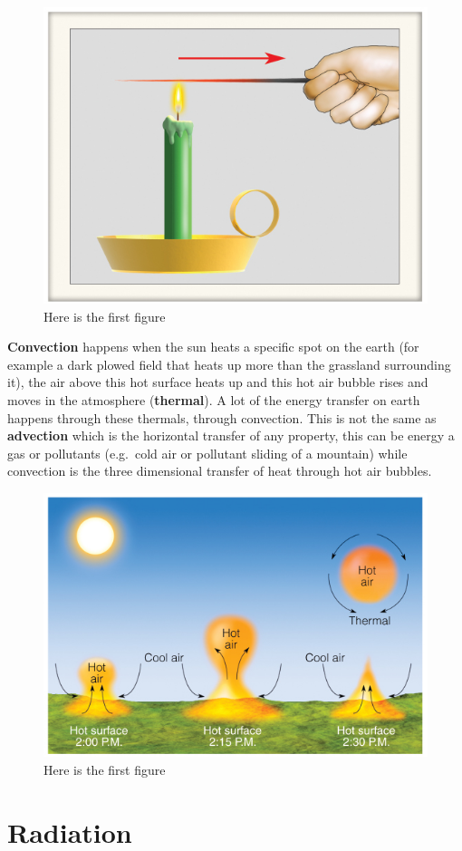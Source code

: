 \documentclass[oneside]{book}
\begin{document}
\begin{figure}

{\centering \includegraphics[width=0.5\linewidth]{figures/Figure118} 

}

\caption{Here is the first figure}\label{fig:Heattransfer2}
\end{figure}

\textbf{Convection} happens when the sun heats a specific spot on the
earth (for example a dark plowed field that heats up more than the
grassland surrounding it), the air above this hot surface heats up and
this hot air bubble rises and moves in the atmosphere
(\textbf{thermal}). A lot of the energy transfer on earth happens
through these thermals, through convection. This is not the same as
\textbf{advection} which is the horizontal transfer of any property,
this can be energy a gas or pollutants (e.g.~cold air or pollutant
sliding of a mountain) while convection is the three dimensional
transfer of heat through hot air bubbles.

\begin{figure}

{\centering \includegraphics[width=0.5\linewidth]{figures/Figure119} 

}

\caption{Here is the first figure}\label{fig:Heattransfer3}
\end{figure}

\section{Radiation}\label{radiation}
\end{document}
